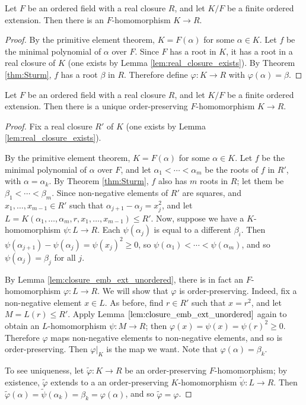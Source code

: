 \begin{lemma}
  \label{lem:closure_emb_ext_unordered}
  Let $F$ be an ordered field with a real closure $R$, and let $K/F$ be a finite ordered extension. Then there is an $F$-homomorphism $K\to R$.
\end{lemma}
\begin{proof}
  By the primitive element theorem, $K=F(\alpha)$ for some $\alpha\in K$. Let $f$ be the minimal polynomial of $\alpha$ over $F$. Since $F$ has a root in $K$, it has a root in a real closure of $K$ (one exists by Lemma \ref{lem:real_closure_exists}). By Theorem \ref{thm:Sturm}, $f$ has a root $\beta$ in $R$. Therefore define $\varphi:K\to R$ with $\varphi(\alpha)=\beta$.
\end{proof}

\begin{lemma}
  \label{lem:closure_emb_ext}
  Let $F$ be an ordered field with a real closure $R$, and let $K/F$ be a finite ordered extension. Then there is a unique order-preserving $F$-homomorphism $K\to R$.
\end{lemma}
\begin{proof}
  Fix a real closure $R'$ of $K$ (one exists by Lemma \ref{lem:real_closure_exists}).
  
  By the primitive element theorem, $K=F(\alpha)$ for some $\alpha\in K$. Let $f$ be the minimal polynomial of $\alpha$ over $F$, and let $\alpha_1<\cdots<\alpha_m$ be the roots of $f$ in $R'$, with $\alpha=\alpha_k$. By Theorem \ref{thm:Sturm}, $f$ also has $m$ roots in $R$; let them be $\beta_1<\cdots<\beta_m$. Since non-negative elements of $R'$ are squares, and $x_1,\dots,x_{m-1}\in R'$ such that $\alpha_{j+1}-\alpha_j=x_j^2$, and let $L=K(\alpha_1,\dots,\alpha_m,r,x_1,\dots,x_{m-1})\leq R'$. Now, suppose we have a $K$-homomorphism $\psi:L\to R$. Each $\psi(\alpha_j)$ is equal to a different $\beta_i$. Then $\psi(\alpha_{j+1})-\psi(\alpha_j)=\psi(x_j)^2\geq0$, so $\psi(\alpha_1)<\cdots<\psi(\alpha_m)$, and so $\psi(\alpha_j)=\beta_j$ for all $j$.

  By Lemma \ref{lem:closure_emb_ext_unordered}, there is in fact an $F$-homomorphism $\varphi:L\to R$. We will show that $\varphi$ is order-preserving. Indeed, fix a non-negative element $x\in L$. As before, find $r\in R'$ such that $x=r^2$, and let $M=L(r)\leq R'$. Apply Lemma $\ref{lem:closure_emb_ext_unordered}$ again to obtain an $L$-homomorphism $\psi:M\to R$; then $\varphi(x)=\psi(x)=\psi(r)^2\geq0$. Therefore $\varphi$ maps non-negative elements to non-negative elements, and so is order-preserving. Then $\varphi|_K$ is the map we want. Note that $\varphi(\alpha)=\beta_k$.

  To see uniqueness, let $\tilde\varphi:K\to R$ be an order-preserving $F$-homomorphism; by existence, $\tilde\varphi$ extends to a an order-preserving $K$-homomorphism $\tilde\psi:L\to R$. Then $\tilde\varphi(\alpha)=\tilde\psi(\alpha_k)=\beta_k=\varphi(\alpha)$, and so $\tilde\varphi=\varphi$.
\end{proof}

